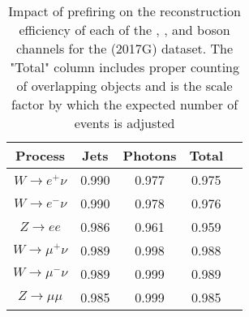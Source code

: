 \begin{table}[htbp]
\begin{center}
\begin{tabular}{|c|c|c|c|c|}
\hline
Process & Jets & Photons & Total \\\hline \hline
$W\rightarrow e^+\nu$      & 0.990 & 0.977 & 0.975 \\
$W\rightarrow e^-\nu$      & 0.990 & 0.978 & 0.976 \\
$Z\rightarrow ee$          & 0.986 & 0.961 & 0.959 \\
\hline
$W\rightarrow \mu^+\nu$   & 0.989 & 0.998 & 0.988 \\
$W\rightarrow \mu^-\nu$   & 0.989 & 0.999 & 0.989\\
$Z\rightarrow \mu\mu$     & 0.985 & 0.999 & 0.985 \\
\hline
\end{tabular} 
\end{center}


\caption{Impact of prefiring on the reconstruction efficiency of each of the \Wp, \Wm, and \Z boson channels for the \sg (2017G) dataset. The "Total" column includes proper counting of overlapping objects and is the scale factor by which the expected number of events is adjusted}
\label{tab:prefire:5}
\end{table}
